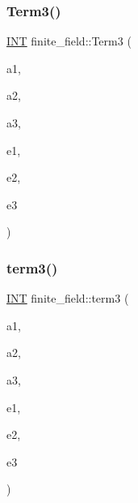 \subsubsection{\texorpdfstring{Term3()}{Term3()}}
{\footnotesize\ttfamily \mbox{\hyperlink{galois_8h_a09fddde158a3a20bd2dcadb609de11dc}{I\+NT}} finite\+\_\+field\+::\+Term3 (\begin{DoxyParamCaption}\item[{\mbox{\hyperlink{galois_8h_a09fddde158a3a20bd2dcadb609de11dc}{I\+NT}}}]{a1,  }\item[{\mbox{\hyperlink{galois_8h_a09fddde158a3a20bd2dcadb609de11dc}{I\+NT}}}]{a2,  }\item[{\mbox{\hyperlink{galois_8h_a09fddde158a3a20bd2dcadb609de11dc}{I\+NT}}}]{a3,  }\item[{\mbox{\hyperlink{galois_8h_a09fddde158a3a20bd2dcadb609de11dc}{I\+NT}}}]{e1,  }\item[{\mbox{\hyperlink{galois_8h_a09fddde158a3a20bd2dcadb609de11dc}{I\+NT}}}]{e2,  }\item[{\mbox{\hyperlink{galois_8h_a09fddde158a3a20bd2dcadb609de11dc}{I\+NT}}}]{e3 }\end{DoxyParamCaption})}

\mbox{\label{classfinite__field_a15b3f6cc7155b8698b17575e7f46bbfa}} 
\subsubsection{\texorpdfstring{term3()}{term3()}}
{\footnotesize\ttfamily \mbox{\hyperlink{galois_8h_a09fddde158a3a20bd2dcadb609de11dc}{I\+NT}} finite\+\_\+field\+::term3 (\begin{DoxyParamCaption}\item[{\mbox{\hyperlink{galois_8h_a09fddde158a3a20bd2dcadb609de11dc}{I\+NT}}}]{a1,  }\item[{\mbox{\hyperlink{galois_8h_a09fddde158a3a20bd2dcadb609de11dc}{I\+NT}}}]{a2,  }\item[{\mbox{\hyperlink{galois_8h_a09fddde158a3a20bd2dcadb609de11dc}{I\+NT}}}]{a3,  }\item[{\mbox{\hyperlink{galois_8h_a09fddde158a3a20bd2dcadb609de11dc}{I\+NT}}}]{e1,  }\item[{\mbox{\hyperlink{galois_8h_a09fddde158a3a20bd2dcadb609de11dc}{I\+NT}}}]{e2,  }\item[{\mbox{\hyperlink{galois_8h_a09fddde158a3a20bd2dcadb609de11dc}{I\+NT}}}]{e3 }\end{DoxyParamCaption})}

